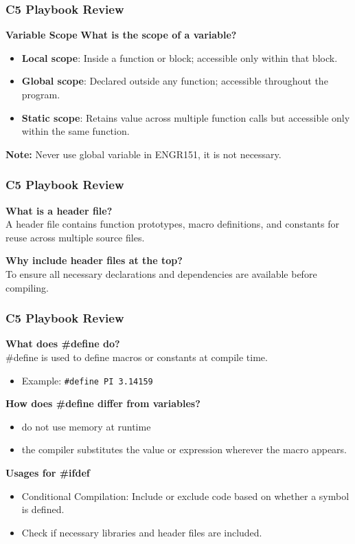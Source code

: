 \documentclass[
	11pt, %
]{beamer}
\begin{document}
	\begin{frame}
		\frametitle{C5 Playbook Review}
		\textbf{Variable Scope}
	\textbf{What is the scope of a variable?}
	\begin{itemize}
		\item \textbf{Local scope}: Inside a function or block; accessible only within that block.
		\item \textbf{Global scope}: Declared outside any function; accessible throughout the program.
		\item \textbf{Static scope}: Retains value across multiple function calls but accessible only within the same function.
	\end{itemize}
	
	\textbf{Note:} Never use global variable in ENGR151, it is not necessary.
	\end{frame}
	
	
	\begin{frame}
	\frametitle{C5 Playbook Review}
	\textbf{What is a header file?} \\
	A header file contains function prototypes, macro definitions, and constants for reuse across multiple source files.
	
	\textbf{Why include header files at the top?} \\
	To ensure all necessary declarations and dependencies are available before compiling.
	
	\end{frame}
	
	\begin{frame}
	\frametitle{C5 Playbook Review}
	\textbf{What does \#define do?} \\
	\#define is used to define macros or constants at compile time.
	\begin{itemize}
		\item Example: \texttt{\#define PI 3.14159}
	\end{itemize}
	
	\textbf{How does \#define differ from variables?} \\
	\begin{itemize}
		\item do not use memory at runtime
		\item  the compiler substitutes the value or expression wherever the macro appears.
	\end{itemize}
	
	\textbf{Usages for \#ifdef}

	\begin{itemize}
		\item Conditional Compilation: Include or exclude code based on whether a symbol is defined.
		\item Check if necessary libraries and header files are included.
	\end{itemize}
	\end{frame}
	
\end{document}
